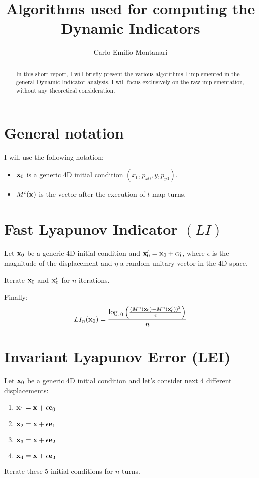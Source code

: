 \documentclass[10pt,a4paper]{article}
\title{Algorithms used for computing the Dynamic Indicators}
\author{Carlo Emilio Montanari}
\begin{document}
\maketitle

\begin{abstract}
    In this short report, I will briefly present the various algorithms I implemented in the general Dynamic Indicator analysis. I will focus exclusively on the raw implementation, without any theoretical consideration.
\end{abstract}

\section{General notation}

I will use the following notation:

\begin{itemize}
    \item $\vb{x}_0$ is a generic 4D initial condition $(x_0, p_{x0}, y, p_{y0})$.
    \item $M^t(\vb{x})$ is the vector after the execution of $t$ map turns.
\end{itemize}


\section{Fast Lyapunov Indicator $(LI)$}

Let $\vb{x}_0$ be a generic 4D initial condition and $\vb{x}'_0 = \vb{x}_0 + \epsilon \vb{\eta}$, where $\epsilon$ is the magnitude of the displacement and $\eta$ a random unitary vector in the 4D space.

Iterate $\vb{x}_0$ and $\vb{x}'_0$ for $n$ iterations.

Finally:
\begin{equation}
LI_n(\vb{x}_0) = \frac{\log_{10} \left(\frac{(M^n(\vb{x}_0)-M^n(\vb{x}'_0))^2}{\epsilon}\right)}{n}
\end{equation}

\section{Invariant Lyapunov Error (LEI)}

Let $\vb{x}_0$ be a generic 4D initial condition and let's consider next 4 different displacements:
\begin{enumerate}
    \item $\vb{x}_1 = \vb{x} + \epsilon \vb{e}_0$
    \item $\vb{x}_2 = \vb{x} + \epsilon \vb{e}_1$
    \item $\vb{x}_3 = \vb{x} + \epsilon \vb{e}_2$
    \item $\vb{x}_4 = \vb{x} + \epsilon \vb{e}_3$
\end{enumerate}
Iterate these 5 initial conditions for $n$ turns.
\end{document}

